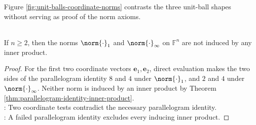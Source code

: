 \begin{illustrationfigure}[H]
  \centering
  
  \caption{The $\ell_1$, $\ell_2$, and $\ell_\infty$ unit balls in $\mathbb{R}^2$ are respectively a diamond, a disk, and a square.}
  \label{fig:unit-balls-coordinate-norms}
\end{illustrationfigure}

Figure \ref{fig:unit-balls-coordinate-norms} contrasts the three unit-ball shapes without serving as proof of the norm axioms.\par

\begin{corollary} \label{cor:l1-linfty-not-inner-product-norms} \\
If $n\geq2$, then the norms $\norm{\cdot}_1$ and $\norm{\cdot}_{\infty}$ on $\mathbb{F}^n$ are not induced by any inner product.
\begin{proof}
For the first two coordinate vectors $\mathbf{e}_1,\mathbf{e}_2$, direct evaluation makes the two sides of the parallelogram identity $8$ and $4$ under $\norm{\cdot}_1$, and $2$ and $4$ under $\norm{\cdot}_{\infty}$. Neither norm is induced by an inner product by Theorem \ref{thm:parallelogram-identity-inner-product}.\\
: Two coordinate tests contradict the necessary parallelogram identity.\\
: A failed parallelogram identity excludes every inducing inner product.
\end{proof}
\end{corollary}

